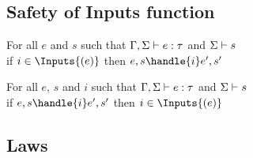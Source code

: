 \subsection{Safety of Inputs function}

\begin{theorem}
  For all $e$ and $s$ such that $\Gamma,\Sigma\vdash e:\tau$ and $\Sigma\vdash s$\\
  if $i\in\Inputs{(e)}$ then $e,s\handle{i}e',s'$
  \label{thmsafetyi1}
\end{theorem}

\begin{theorem}
  For all $e$, $s$ and $i$ such that $\Gamma,\Sigma\vdash e:\tau$ and $\Sigma\vdash s$\\
  if $e,s\handle{i}e',s'$ then  $i\in\Inputs{(e)}$
  \label{thmsafetyi2}
\end{theorem}
\subsection{Laws}
